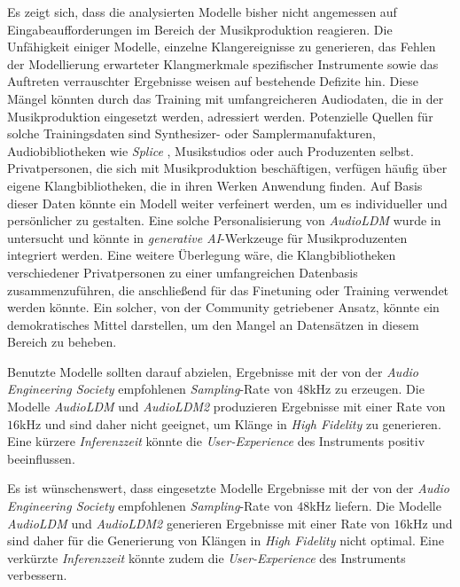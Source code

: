 \documentclass[
  a4paper,  %
  twoside,  %
  bibliography=totoc,
  headsepline,
  cleardoublepage=empty,
  parskip=half,
  draft=false
]{scrbook}
\begin{document}
{Es zeigt sich, dass die analysierten Modelle bisher nicht angemessen auf Eingabeaufforderungen im Bereich der Musikproduktion reagieren. Die Unfähigkeit einiger Modelle, einzelne Klangereignisse zu generieren, das Fehlen der Modellierung erwarteter Klangmerkmale spezifischer Instrumente sowie das Auftreten verrauschter Ergebnisse weisen auf bestehende Defizite hin. Diese Mängel könnten durch das Training mit umfangreicheren Audiodaten, die in der Musikproduktion eingesetzt werden, adressiert werden. Potenzielle Quellen für solche Trainingsdaten sind Synthesizer- oder Samplermanufakturen, Audiobibliotheken wie \emph{Splice} \cite{noauthor_royalty-free_nodate}, Musikstudios oder auch Produzenten selbst. Privatpersonen, die sich mit Musikproduktion beschäftigen, verfügen häufig über eigene Klangbibliotheken, die in ihren Werken Anwendung finden. Auf Basis dieser Daten könnte ein Modell weiter verfeinert werden, um es individueller und persönlicher zu gestalten. Eine solche Personalisierung von \emph{AudioLDM} \cite{liu_audioldm_2023} wurde in \cite{plitsis_investigating_2023} untersucht und könnte in \emph{generative AI}-Werkzeuge für Musikproduzenten integriert werden. Eine weitere Überlegung wäre, die Klangbibliotheken verschiedener Privatpersonen zu einer umfangreichen Datenbasis zusammenzuführen, die anschließend für das Finetuning oder Training verwendet werden könnte. Ein solcher, von der Community getriebener Ansatz, könnte ein demokratisches Mittel darstellen, um den Mangel an Datensätzen in diesem Bereich zu beheben. 

Benutzte Modelle sollten darauf abzielen, Ergebnisse mit der von der \emph{Audio Engineering Society} empfohlenen \emph{Sampling}-Rate von $48$kHz \cite{audio_engineering_society_inc_aes5-2018_2018} zu erzeugen. Die Modelle \emph{AudioLDM} \cite{liu_audioldm_2023} und \emph{AudioLDM2} \cite{liu_audioldm2_2023} produzieren Ergebnisse mit einer Rate von $16$kHz und sind daher nicht geeignet, um Klänge in \emph{High Fidelity} zu generieren. Eine kürzere \emph{Inferenzzeit} könnte die \emph{User-Experience} des Instruments positiv beeinflussen.

Es ist wünschenswert, dass eingesetzte Modelle Ergebnisse mit der von der \emph{Audio Engineering Society} empfohlenen \emph{Sampling}-Rate von $48$kHz \cite{audio_engineering_society_inc_aes5-2018_2018} liefern. Die Modelle \emph{AudioLDM} \cite{liu_audioldm_2023} und \emph{AudioLDM2} \cite{liu_audioldm2_2023} generieren Ergebnisse mit einer Rate von $16$kHz und sind daher für die Generierung von Klängen in \emph{High Fidelity} nicht optimal. Eine verkürzte \emph{Inferenzzeit} könnte zudem die \emph{User-Experience} des Instruments verbessern.

}
\end{document}
